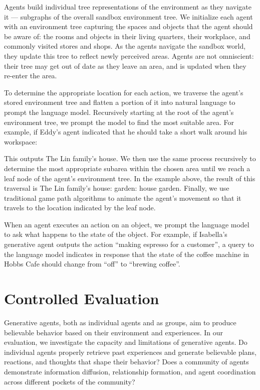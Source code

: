 Agents build individual tree representations of the environment as they navigate it --- subgraphs of the overall sandbox environment tree. We initialize each agent with an environment tree capturing the spaces and objects that the agent should be aware of: the rooms and objects in their living quarters, their workplace, and commonly visited stores and shops. As the agents navigate the sandbox world, they update this tree to reflect newly perceived areas. Agents are not omniscient: their tree may get out of date as they leave an area, and is updated when they re-enter the area.

To determine the appropriate location for each action, we traverse the agent's stored environment tree and flatten a portion of it into natural language to prompt the language model. Recursively starting at the root of the agent's environment tree, we prompt the model to find the most suitable area. For example, if Eddy's agent indicated that he should  {\color{darkgray}\small\fontfamily{}\selectfont
take a short walk around his workspace}:

\begin{quote}

\end{quote}

This outputs {\color{darkgray}\small\fontfamily{}\selectfont
The Lin family’s house}. We then use the same process recursively to determine the most appropriate subarea within the chosen area until we reach a leaf node of the agent's environment tree. In the example above, the result of this traversal is {\color{darkgray}\small\fontfamily{}\selectfont
The Lin family’s house: garden: house garden}. Finally, we use traditional game path algorithms to animate the agent's movement so that it travels to the location indicated by the leaf node.

When an agent executes an action on an object, we prompt the language model to ask what happens to the state of the object. For example, if Isabella's generative agent outputs the action ``making espresso for a customer'', a query to the language model indicates in response that the state of the coffee machine in Hobbs Cafe should change from ``off'' to ``brewing coffee''.

\section{Controlled Evaluation} Generative agents, both as individual agents and as groups, aim to produce believable behavior based on their environment and experiences. In our evaluation, we investigate the capacity and limitations of generative agents. Do individual agents properly retrieve past experiences and generate believable plans, reactions, and thoughts that shape their behavior? Does a community of agents demonstrate information diffusion, relationship formation, and agent coordination across different pockets of the community?

